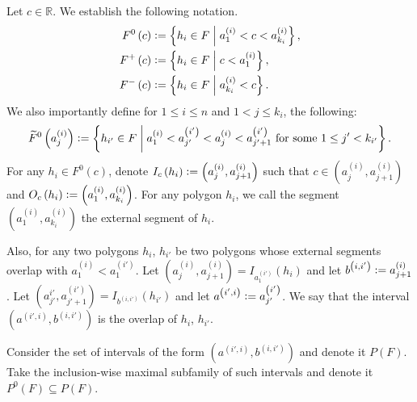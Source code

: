 \documentclass[12pt]{article}
\theoremstyle{definition}
\newcommand{\defeq}{\vcentcolon=}
\begin{document}
     Let $c \in \mathbb{R}$.
     We establish the following notation.
     \begin{align*}
         F^{0}\left(c\right) &\defeq
         \left\{h_{i} \in F \;\middle|\;
         a_{1}^{\left(i\right)}
         < c < a_{k_{i}}^{\left(i\right)}\right\}, \\
         F^{+}\left(c\right) &\defeq
         \left\{h_{i} \in F \;\middle|\;
         c < a_{1}^{\left(i\right)}\right\},\\
         F^{-}\left(c\right) &\defeq
         \left\{h_{i} \in F
         \;\middle|\; a_{k_{i}}^{\left(i\right)} < c\right\}.
     \end{align*}
     We also importantly define for
     $1 \leq i \leq n$ and 
     $1 < j \leq k_{i}$, 
     the following:
     \begin{gather*}
         \widetilde{F}^{0}\left(a_{j}^{\left(i\right)}\right)
         \defeq \left\{
         h_{i'} \in F \;\middle|\;
         a_{1}^{\left(i\right)} < a_{j'}^{\left(i'\right)}
         < a_{j}^{\left(i\right)}
         < a_{j'+1}^{\left(i'\right)}
         \text{ for some }
         1 \leq j' < k_{i'} \right\}.
     \end{gather*}
     For any $h_{i} \in F^{0}\left(c\right)$,
     denote $I_{c}\left(h_{i}\right)
     \defeq \left(a_{j}^{\left(i\right)},
     a_{j+1}^{\left(i\right)}\right)$ 
     such that $c \in 
     \left(a_{j}^{\left(i\right)},
     a_{j+1}^{\left(i\right)}\right)$ 
     and $O_{c}\left(h_{i}\right)
     \defeq \left(a_{1}^{\left(i\right)},
     a_{k_{i}}^{\left(i\right)}\right)$.
     For any polygon $h_{i}$,
     we call the segment
     $\left(a_{1}^{\left(i\right)},
     a_{k_{i}}^{\left(i\right)}\right)$
     the external
     segment of $h_{i}$.

     Also, for any two polygons
     $h_{i}$, $h_{i'}$ be two
     polygons whose external segments
     overlap with
     $a_1^{\left(i\right)} < a_1^{\left(i'\right)}$.
     Let $\left(a_{j}^{\left(i\right)},
     a_{j+1}^{\left(i\right)}\right) =
     I_{a_1^{\left(i'\right)}}\left(h_{i}\right)$
     and let
     $b^{\left(i, i'\right)} \defeq a_{j+1}^{\left(i\right)}$.
     Let $\left(a_{j'}^{i'}, a_{j'+1}^{\left(i'\right)}\right)
     = I_{b^{\left(i,i'\right)}}\left(h_{i'}\right)$ 
     and let $a^{\left(i',i\right)}
     \defeq a_{j'}^{\left(i'\right)}$.
     We say that the interval
     $\left(a^{\left(i', i\right)},
     b^{\left(i, i'\right)}\right)$ 
     is the overlap of $h_{i}$, $h_{i'}$.

     Consider the set of intervals
     of the form $\left(a^{\left(i',i\right)},
     b^{\left(i,i'\right)}\right)$ 
     and denote it $P\left(F\right)$.
     Take the inclusion-wise maximal
     subfamily of such intervals
     and denote it $P^{0}\left(F\right)
     \subseteq P\left(F\right)$.
     
\end{document}
